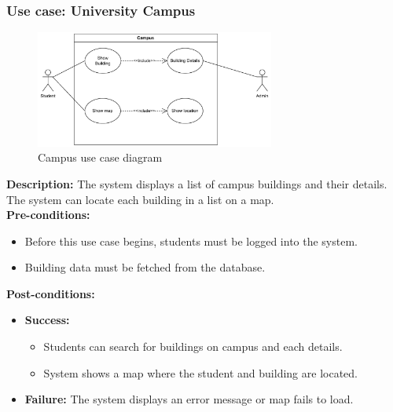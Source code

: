 \documentclass[12pt]{article}
\begin{document}
\subsubsection{Use case: University Campus}
    \begin{figure}[H]
        \centering
        \includegraphics[width=0.7\textwidth]{image/CampusUseCase.pdf} 
        \caption{Campus use case diagram}
        \label{fig:campus_use_case}
    \end{figure}
    \textbf{Description:} The system displays a list of campus buildings and their details. The system can locate each building in a list on a map. \\

    \noindent \textbf{Pre-conditions:} 
        \begin{itemize}
            \item Before this use case begins, students must be logged into the system.
            \item Building data must be fetched from the database.
        \end{itemize}

    \noindent \textbf{Post-conditions:}
    \begin{itemize}
        \item \textbf{Success:} 
        \begin{itemize}
            \item Students can search for buildings on campus and each details.
            \item System shows a map where the student and building are located.
        \end{itemize}
        \item \textbf{Failure:} The system displays an error message or map fails to load.
    \end{itemize}
\end{document}

